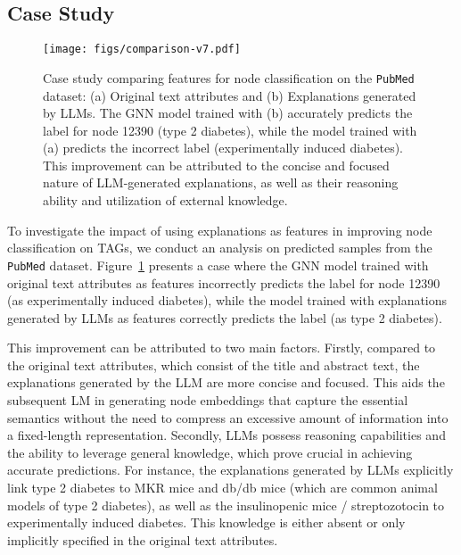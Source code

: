 \documentclass{article}
\begin{document}
\subsection{Case Study}\label{appendix: case study}
\begin{figure}[!ht]
    \centering
    \texttt{[image: figs/comparison-v7.pdf]}
    \caption{Case study comparing features for node classification on the \texttt{PubMed} dataset: (a) Original text attributes and (b) Explanations generated by LLMs. The GNN model trained with (b) accurately predicts the label for node 12390 (type 2 diabetes), while the model trained with (a) predicts the incorrect label (experimentally induced diabetes). This improvement can be attributed to the concise and focused nature of LLM-generated explanations, as well as their reasoning ability and utilization of external knowledge.}
\label{fig: casestudy}
\end{figure}
To investigate the impact of using explanations as features in improving node classification on TAGs, we conduct an analysis on predicted samples from the \texttt{PubMed} dataset. Figure~\ref{fig: casestudy} presents a case where the GNN model trained with original text attributes as features incorrectly predicts the label for node 12390 (as experimentally induced diabetes), while the model trained with explanations generated by LLMs as features correctly predicts the label (as type 2 diabetes).



This improvement can be attributed to two main factors. Firstly, compared to the original text attributes, which consist of the title and abstract text, the explanations generated by the LLM are more concise and focused. This aids the subsequent LM in generating node embeddings that capture the essential semantics without the need to compress an excessive amount of information into a fixed-length representation. Secondly, LLMs possess reasoning capabilities and the ability to leverage general knowledge, which prove crucial in achieving accurate predictions. For instance, the explanations generated by LLMs explicitly link type 2 diabetes to MKR mice and db/db mice (which are common animal models of type 2 diabetes), as well as the insulinopenic mice / streptozotocin to experimentally induced diabetes. This knowledge is either absent or only implicitly specified in the original text attributes.
\end{document}
